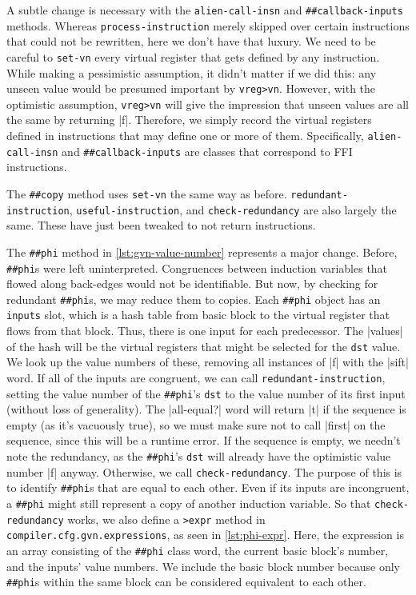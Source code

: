 A subtle change is necessary with the \Verb|alien-call-insn| and
\Verb|##callback-inputs| methods.  Whereas \Verb|process-instruction|
merely skipped over certain instructions that could not be rewritten, here we
don't have that luxury.  We need to be careful to \Verb|set-vn| every virtual
register that gets defined by any instruction.  While making a pessimistic
assumption, it didn't matter if we did this: any unseen value would be presumed
important by \Verb|vreg>vn|.  However, with the optimistic assumption,
\Verb|vreg>vn| will give the impression that unseen values are all the same
by returning \factor|f|.  Therefore, we simply record the virtual registers
defined in instructions that may define one or more of them.  Specifically,
\Verb|alien-call-insn| and \Verb|##callback-inputs| are classes that
correspond to \gls{FFI} instructions.

The \Verb|##copy| method uses \Verb|set-vn| the same way as before.
\Verb|redundant-instruction|, \Verb|useful-instruction|, and
\Verb|check-redundancy| are also largely the same.  These have just been
tweaked to not return instructions.


The \Verb|##phi| method in \vref{lst:gvn-value-number} represents a major
change. Before, \Verb|##phi|s were left uninterpreted.  Congruences between
induction variables that flowed along back-edges would not be identifiable.
But now, by checking for redundant \Verb|##phi|s, we may reduce them to
copies.  Each \Verb|##phi| object has an \Verb|inputs| slot, which is a
hash table from basic block to the virtual register that flows from that block.
Thus, there is one input for each predecessor.  The \factor|values| of the hash
will be the virtual registers that might be selected for the \Verb|dst|
value.  We look up the value numbers of these, removing all instances of
\factor|f| with the \factor|sift| word.  If all of the inputs are congruent, we
can call \Verb|redundant-instruction|, setting the value number of the
\Verb|##phi|'s \Verb|dst| to the value number of its first input (without
loss of generality).  The \factor|all-equal?| word will return \factor|t| if
the sequence is empty (as it's vacuously true), so we must make sure not to
call \factor|first| on the sequence, since this will be a runtime error.  If
the sequence is empty, we needn't note the redundancy, as the \Verb|##phi|'s
\Verb|dst| will already have the optimistic value number \factor|f| anyway.
Otherwise, we call \Verb|check-redundancy|.  The purpose of this is to
identify \Verb|##phi|s that are equal to each other.  Even if its inputs are
incongruent, a \Verb|##phi| might still represent a copy of another induction
variable.  So that \Verb|check-redundancy| works, we also define a
\Verb|>expr| method in \Verb|compiler.cfg.gvn.expressions|, as seen in
\vref{lst:phi-expr}.  Here, the expression is an array consisting of the
\Verb|##phi| class word, the current basic block's number, and the inputs'
value numbers.  We include the basic block number because only \Verb|##phi|s
within the same block can be considered equivalent to each other.

